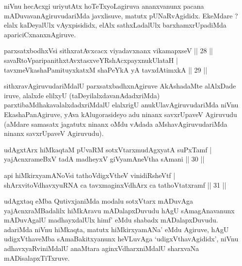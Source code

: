 \begin{artha}
niVnu hecAcxgi uriyutAtx hoTeTxyoLagiruva ananxvanunx pacana mADuvavanAgiruvudariMda javxlisuve, matutx pUNaRvAgididx. EkeMdare ? elalx kaDeyalUlx vAyxpisididx, elAlx sathxLadalUlx barxhamxrUpadiMda apariciCxnanxnAgiruve.
\end{artha}


\begin{shl}
parxsatxbodhxV\s si sithxratAvxcacx viyadavxnanx vikamapxseV \hfill|| 28 || \\
savaRtoV\s paripanithxtAvxtasxveYRshAcxpayxnukUlataH | \\
tavxmeVkashaPamituyxkatxM shaPeYkA yA tavxdAtimxkA \hfill|| 29 || 
\end{shl}

\begin{artha}
sithxravAgiruvudariMdalU parxsatxbadhxnAgiruve AkAshadaMte alAlxDade iruve, alalxde elilxyU (taDeyilalxdavanAdadxriMda) parxtibaMdhakavalalxdadxriMdalU elalxrigU anukUlavAgiruvudariMda niVnu EkashaPanAgiruve, yAva kAlugorasideyo adu ninanx savxrUpaveV Agiruvudu (aMdare samasatx jagatutx ninanx oMdu vAdada aMshavAgiruvudariMda ninanx savxrUpaveV Agiruvudu).
\end{artha}

\begin{shl}
udAgxtArx hiMkaqtaM pUvaRM sotxVtarxmudAgxyatA suPxTamf | \\
yajAcnxrameBxV tadA madheyxV giVyamAneV\s tha sAmani \hfill|| 30 || 
\end{shl}

\begin{shl}
api hiMkirxyamANoV\s si tathoVdigxVtheV vinidiRsheVtf | \\
shArxvitoV\s dhavxyuRNA ca tavxmaginxVdhArx ca tathoVtatxramf \hfill|| 31 || 
\end{shl}

\begin{artha}
udAgxtaq eMba QutivxjaniMda modalu sotxVtarx mADuvAga yajAcnxraMBadalilx hiMkAravu mADalapxDuvudu hAgU sAmagAnavanunx mADuvAgalU madhayxdalUlx himf' eMdu shabadx mADalapxDuvudu. adariMda niVnu hiMkaqta, matutx hiMkirxyamANa' eMdu Agiruve, hAgU udigxVthaveMba sAmaBakitxyanunx heVLuvAga `udigxVthavAgididx', niVnu adhavxyaRviniMdalU anaMtara aginxVdharxniMdalU sharxvaNa mADisalapxTiTxruve.
\end{artha}



